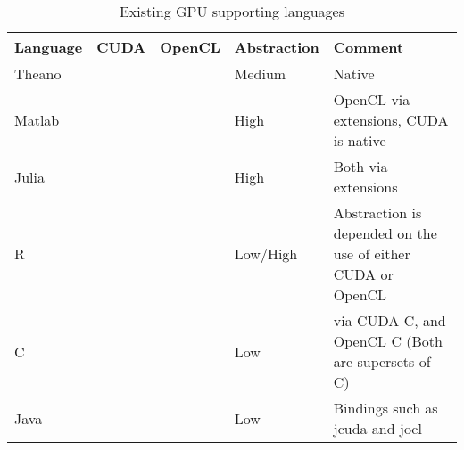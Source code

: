 \begin{table}
	\centering
	\begin{tabular}{|l|c|c|l|l|}
	\hline
	\textbf{Language} & \textbf{CUDA}         & \textbf{OpenCL} & \textbf{Abstraction} & \textbf{Comment}			  		\\ \hline
	Theano   & \cmark           & \cmark            & Medium      &  Native                                                          \\ \hline
	Matlab   & \cmark           & \cmark            & High        &  OpenCL via extensions, CUDA is native                                                         \\ \hline
	Julia    & \cmark           & \cmark              & High        &  Both via extensions                                                          \\ \hline
	R        & \cmark           & \cmark            & Low/High    & Abstraction is depended on the use of either CUDA or OpenCL \\ \hline
	C   & \cmark           & \cmark            & Low         & via CUDA C, and OpenCL C (Both are supersets of C)                                           \\ \hline
	Java     & \cmark           & \cmark              &   Low          & Bindings such as jcuda and jocl                                            \\ \hline
	\end{tabular}
	\caption{Existing GPU supporting languages}\label{tbl:sota}
\end{table}
               

